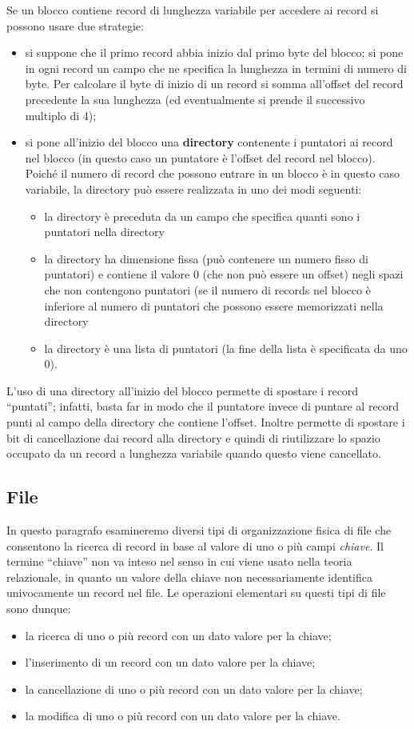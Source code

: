 Se un blocco contiene record di lunghezza variabile per accedere ai record si possono usare due
strategie:
\begin{itemize}
 \item si suppone che il primo record abbia inizio dal primo byte del blocco; si pone in ogni record un
campo che ne specifica la lunghezza in termini di numero di byte. Per calcolare il byte di inizio
di un record si somma all'offset del record precedente la sua lunghezza (ed eventualmente si
prende il successivo multiplo di 4);
 \item si pone all'inizio del blocco una \textbf{directory} contenente i puntatori ai record nel blocco 
 (in questo caso un puntatore è l'offset del record nel blocco). Poiché il numero di record che possono
entrare in un blocco è in questo caso variabile, la directory può essere realizzata in uno dei modi
seguenti:
\begin{itemize}
 \item la directory è preceduta da un campo che specifica quanti sono i puntatori nella directory
 \item la directory ha dimensione fissa (può contenere un numero fisso di puntatori) e contiene il
valore 0 (che non può essere un offset) negli spazi che non contengono puntatori (se il
numero di records nel blocco è inferiore al numero di puntatori che possono essere
memorizzati nella directory
\item la directory è una lista di puntatori (la fine della lista è specificata da uno 0).
\end{itemize}
\end{itemize}
L'uso di una directory all'inizio del blocco permette di spostare i record ``puntati''; infatti, basta 
far in modo che il puntatore invece di puntare al record punti al campo della directory che contiene
l'offset. Inoltre permette di spostare i bit di cancellazione dai record alla directory e quindi di
riutilizzare lo spazio occupato da un record a lunghezza variabile quando questo viene cancellato.

\subsection{File}
In questo paragrafo esamineremo diversi tipi di organizzazione fisica di file che consentono la
ricerca di record in base al valore di uno o più campi \emph{chiave}. Il termine ``chiave'' non va inteso nel
senso in cui viene usato nella teoria relazionale, in quanto un valore della chiave non necessariamente 
identifica univocamente un record nel file.
Le operazioni elementari su questi tipi di file sono dunque:
\begin{itemize}
 \item la ricerca di uno o più record con un dato valore per la chiave;
 \item l'inserimento di un record con un dato valore per la chiave;
 \item la cancellazione di uno o più record con un dato valore per la chiave;
 \item la modifica di uno o più record con un dato valore per la chiave. 
\end{itemize}

